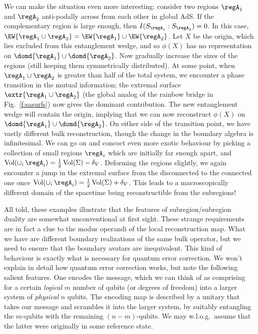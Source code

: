 \documentclass[12pt,openany]{book}
\begin{document}
 We can make the situation even more interesting: consider two regions $\regA_1$ and $\regA_2$ anti-podally across from each other in global AdS. If the complementary region is large enough, then $I(S_{\regA_1} : S_{\regA_2}) =0$. In this case,  $\EW{\regA_1 \cup\regA_2} = \EW{\regA_1} \cup \EW{\regA_2}$. Let $X$ be the origin, which lies excluded from this entanglement wedge, and so $\phi(X)$ has no representation on $\domd{\regA_1} \cup \domd{\regA_2}$. Now gradually increase the sizes of the regions (still keeping them symmetrically distributed). At some point, when  $\regA_1\cup\regA_2$
 is greater than half of the total system,  we encounter a phase transition in the mutual information; the extremal surface $\extr{\regA_1 \cup \regA_2}$  (the global analog of the rainbow bridge in Fig.~\ref{f:sasurfs}) now gives the dominant contribution.   The new entanglement wedge will contain the origin, implying that we can now reconstruct $\phi(X)$ on $\domd{\regA_1} \cup \domd{\regA_2}$. On either side of the transition point, we have vastly different bulk reconstruction, though the change in the boundary algebra is infinitesimal. We can go on and concoct even more exotic behaviour by picking a collection of small regions $\regA_i$ which are initially far enough apart, and
 $\text{Vol}(\cup_i \, \regA_i) = \frac{1}{2} \, \text{Vol}(\Sigma) - \delta_V$. Deforming  the regions slightly, we again encounter a jump in the extremal surface from the disconnected to the connected one once
  $\text{Vol}(\cup_i \, \regA_i) = \frac{1}{2} \, \text{Vol}(\Sigma) + \delta_V$.  This leads to a macroscopically different domain of the spacetime being reconstructible from the subregions!


All told, these examples illustrate that the features of subregion/subregion duality are somewhat unconventional at first sight. These strange requirements are in fact a clue to the modus operandi of the local reconstruction map. What we have are different boundary realizations of the same bulk operator, but we need to ensure that the boundary avatars are inequivalent. This kind of behaviour is exactly what is necessary for quantum error correction. We won't explain in detail how quantum error correction works, but note the following salient features. One encodes the message, which we can think of as comprising for a certain  \emph{logical} $m$ number of qubits (or  degrees of freedom)  into a larger system of \emph{physical} $n$ qubits. The encoding map is described by a unitary that takes our message and scrambles it into the larger system, by suitably entangling the $m$-qubits with the remaining $(n-m)$-qubits. We may w.l.o.g.\ assume that the latter were originally in some reference state.
\end{document}
